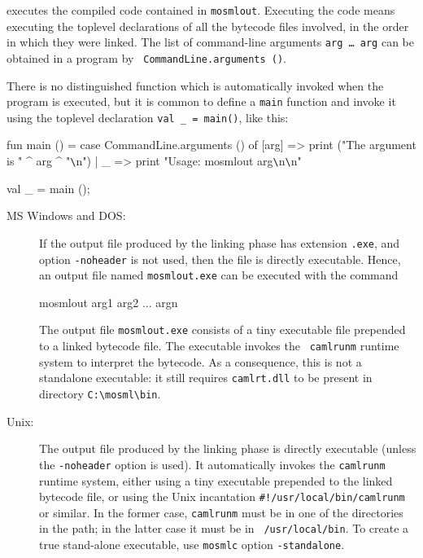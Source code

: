 \documentclass[fleqn,a4paper]{article}
\begin{document}
\noindent executes the compiled code contained in {\tt mosmlout}.
Executing the code means executing the toplevel declarations of all
the bytecode files involved, in the order in which they were linked.
The list of command-line arguments \texttt{arg \ldots\ 
  arg} can be obtained in a program by {\tt
  CommandLine.arguments ()}.

There is no distinguished function which is automatically invoked when
the program is executed, but it is common to define a \texttt{main}
function and invoke it using the toplevel declaration \texttt{val \_ =
  main()}, like this:

\begin{program}
fun main () = 
    case CommandLine.arguments () of 
        [arg] => print ("The argument is " ^ arg ^ "\verb+\+n")
      | _     => print "Usage: mosmlout arg\verb+\+n\verb+\+n"

val _ = main ();
\end{program}




\begin{description}
\item[MS Windows and DOS:] If the output file produced by the linking
  phase has extension {\tt .exe}, and option {\tt -noheader} is not
  used, then the file is directly executable.  Hence, an output file
  named {\tt mosmlout.exe} can be executed with the command

\begin{program}
mosmlout arg1 arg2 ... argn    
\end{program}

The output file {\tt mosmlout.exe} consists of a tiny executable file
prepended to a linked bytecode file.  The executable invokes the {\tt
  camlrunm} runtime system to interpret the bytecode.  As a
consequence, this is not a standalone executable: it still requires
{\tt camlrt.dll} to be present in directory \verb+C:\mosml\bin+.

\item[Unix:] The output file produced by the linking phase is directly
  executable (unless the {\tt -noheader} option is used).  It
  automatically invokes the {\tt camlrunm} runtime system, either
  using a tiny executable prepended to the linked bytecode file, or
  using the Unix incantation \verb|#!/usr/local/bin/camlrunm| or
  similar.  In the former case, {\tt camlrunm} must be in one of the
  directories in the path; in the latter case it must be in {\tt
    /usr/local/bin}.  To create a true stand-alone executable, use
  \texttt{mosmlc} option \texttt{-standalone}.
\end{description}
\end{document}
